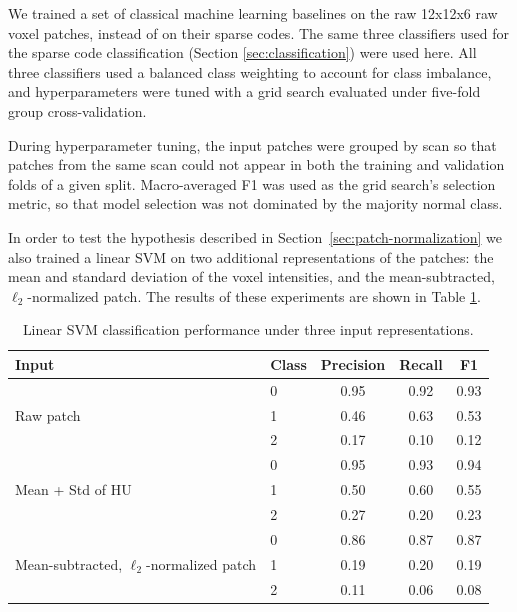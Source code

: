 We trained a set of classical machine learning baselines on the raw 12x12x6 raw voxel patches, instead of on their sparse codes.
The same three classifiers used for the sparse code classification (Section \ref{sec:classification}) were used here.
All three classifiers used a balanced class weighting to account for class imbalance, and
hyperparameters were tuned with a grid search evaluated
under five-fold group cross-validation.

During hyperparameter tuning, the input patches were grouped by scan so that patches from
the same scan could not appear in both the training and validation folds of
a given split. Macro-averaged F1 was used as the grid search's selection
metric, so that model selection was not dominated by the majority normal class.

In order to test the hypothesis described in Section~\ref{sec:patch-normalization} we also trained a linear SVM on two additional
representations of the patches: the mean and standard deviation of the voxel intensities, and the mean-subtracted,
$\ell_2$-normalized patch. The results of these experiments are shown in Table \ref{tab:patch-classification}.

\begin{table}
\centering
\caption{Linear SVM classification performance under three input representations.}
\label{tab:patch-classification}
\begin{tabular}{llccc}
\toprule
\textbf{Input} & \textbf{Class} & \textbf{Precision} & \textbf{Recall} & \textbf{F1} \\
\midrule
\multirow{3}{*}{Raw patch}
 & 0       & 0.95 & 0.92 & 0.93 \\
 & 1                & 0.46 & 0.63 & 0.53 \\
 & 2                & 0.17 & 0.10 & 0.12 \\
\midrule
\multirow{3}{*}{Mean + Std of HU}
 & 0       & 0.95 & 0.93 & 0.94 \\
 & 1                & 0.50 & 0.60 & 0.55 \\
 & 2                & 0.27 & 0.20 & 0.23 \\
\midrule
\multirow{3}{*}{Mean-subtracted, $\ell_2$-normalized patch}
 & 0       & 0.86 & 0.87 & 0.87 \\
 & 1                & 0.19 & 0.20 & 0.19 \\
 & 2                & 0.11 & 0.06 & 0.08 \\
\bottomrule
\end{tabular}
\end{table}

